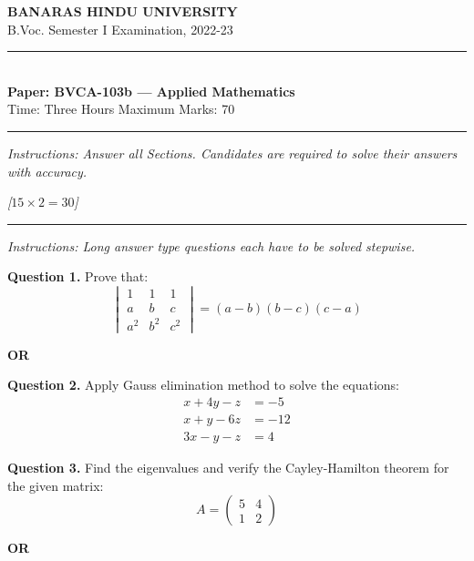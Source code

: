 \documentclass[11pt,a4paper]{article}
\newcommand{\pts}[1]{\hfill   \textit{[#1]}}
\begin{document}
\begin{center}
  {\large\bfseries BANARAS HINDU UNIVERSITY}\\[2pt]
  {\normalsize B.Voc. Semester I Examination, 2022-23}\\[6pt]
  \rule{0.8\linewidth}{0.5pt}\\[6pt]
  {\large\bfseries Paper: BVCA-103b --- Applied Mathematics}\\[4pt]
  {\normalsize Time: Three Hours \hfill Maximum Marks: 70}
\end{center}

\rule{\linewidth}{0.4pt}

\smallskip



\noindent   \textit{Instructions: Answer all Sections. Candidates are required to solve their answers with accuracy.}

\bigskip

\bigskip


\pts{$15  \times 2 = 30$}
\rule{\linewidth}{0.4pt}\smallskip




\noindent   \textit{Instructions: Long answer type questions each have to be solved stepwise.}

\medskip


\noindent   \textbf{Question 1.} Prove that:
\[

\begin{vmatrix}
  1 & 1 & 1 \\
  a & b & c \\
  a^2 & b^2 & c^2
\end{vmatrix} = (a-b)(b-c)(c-a)
\]
\centerline{   \textbf{OR}}

\medskip


\noindent   \textbf{Question 2.} Apply Gauss elimination method to solve the equations:
\[

\begin{aligned}
  x + 4y - z &= -5 \\
  x + y - 6z &= -12 \\
  3x - y - z &= 4
\end{aligned}
\]

\medskip


\noindent   \textbf{Question 3.} Find the eigenvalues and verify the Cayley-Hamilton theorem for the given matrix:
\[
A = 
\begin{pmatrix}
  5 & 4 \\
  1 & 2
\end{pmatrix}
\]
\centerline{   \textbf{OR}}
\end{document}
